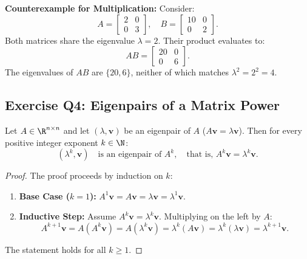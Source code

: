 \begin{example}
\medskip
\noindent\textbf{Counterexample for Multiplication:}
Consider:
\begin{equation}
    A = \begin{bmatrix} 2 & 0 \\ 0 & 3 \end{bmatrix}, \quad B = \begin{bmatrix} 10 & 0 \\ 0 & 2 \end{bmatrix}.
\end{equation}
Both matrices share the eigenvalue $\lambda = 2$. Their product evaluates to:
\begin{equation}
    AB = \begin{bmatrix} 20 & 0 \\ 0 & 6 \end{bmatrix}.
\end{equation}
The eigenvalues of $AB$ are $\{20, 6\}$, neither of which matches $\lambda^2 = 2^2 = 4$.
\end{example}

\subsection{Exercise Q4: Eigenpairs of a Matrix Power}

\begin{theorem}
\label{thm:matrix-power}
Let $A \in \R^{n \times n}$ and let $(\lambda, \mathbf{v})$ be an eigenpair of $A$ ($A\mathbf{v} = \lambda \mathbf{v}$). Then for every positive integer exponent $k \in \N$:
\begin{equation}
    (\lambda^k, \mathbf{v}) \quad \text{is an eigenpair of } A^k, \quad \text{that is, } A^k \mathbf{v} = \lambda^k \mathbf{v}.
\end{equation}
\end{theorem}

\begin{proof}
The proof proceeds by induction on $k$:
\begin{enumerate}
    \item \textbf{Base Case ($k=1$):} $A^1 \mathbf{v} = A\mathbf{v} = \lambda \mathbf{v} = \lambda^1 \mathbf{v}$.
    \item \textbf{Inductive Step:} Assume $A^k \mathbf{v} = \lambda^k \mathbf{v}$. Multiplying on the left by $A$:
    \begin{equation}
        A^{k+1} \mathbf{v} = A(A^k \mathbf{v}) = A(\lambda^k \mathbf{v}) = \lambda^k (A\mathbf{v}) = \lambda^k (\lambda \mathbf{v}) = \lambda^{k+1} \mathbf{v}.
    \end{equation}
\end{enumerate}
The statement holds for all $k \ge 1$.
\end{proof}


